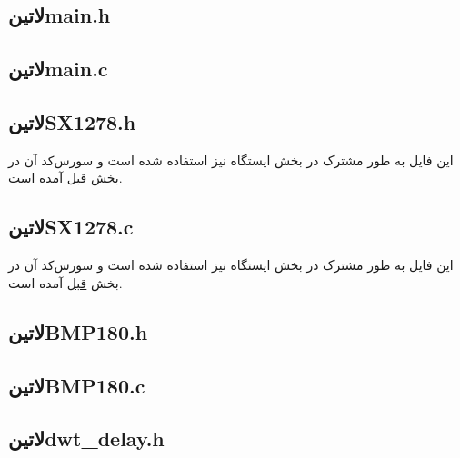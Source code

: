 \subsection*{‌لاتین{main.h}}
\begin{latin}
	
\end{latin}

\subsection*{‌لاتین{main.c}}
\begin{latin}
	
\end{latin}

\subsection*{‌لاتین{SX1278.h}}
این فایل به طور مشترک در بخش ایستگاه نیز استفاده شده است و سورس‌کد آن در بخش \hyperref[SX1278.h]{قبل} آمده است.

\subsection*{‌لاتین{SX1278.c}}
این فایل به طور مشترک در بخش ایستگاه نیز استفاده شده است و سورس‌کد آن در بخش \hyperref[SX1278.c]{قبل} آمده است.

\subsection*{‌لاتین{BMP180.h}}
\begin{latin}
	
\end{latin}

\subsection*{‌لاتین{BMP180.c}}
\begin{latin}
	
\end{latin}

\subsection*{‌لاتین{dwt\_delay.h}}
\begin{latin}
	
\end{latin}


